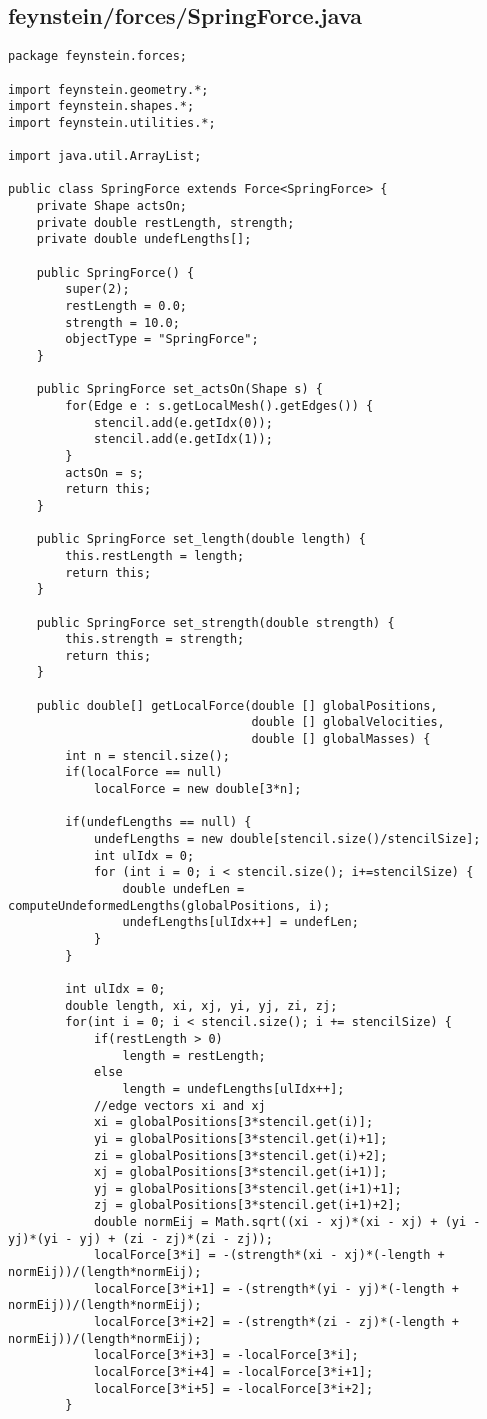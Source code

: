 \subsection*{feynstein/forces/SpringForce.java}
\begin{lstlisting}
package feynstein.forces;

import feynstein.geometry.*;
import feynstein.shapes.*;
import feynstein.utilities.*;

import java.util.ArrayList;

public class SpringForce extends Force<SpringForce> {
    private Shape actsOn;
    private double restLength, strength;
	private double undefLengths[];
	
    public SpringForce() {
		super(2);
		restLength = 0.0;
		strength = 10.0;
		objectType = "SpringForce";
    }

    public SpringForce set_actsOn(Shape s) {
		for(Edge e : s.getLocalMesh().getEdges()) {
			stencil.add(e.getIdx(0));
			stencil.add(e.getIdx(1));
		}
		actsOn = s;
		return this;
    }

    public SpringForce set_length(double length) {
		this.restLength = length;
		return this;
    }

    public SpringForce set_strength(double strength) {
		this.strength = strength;
		return this;
    }
	
	public double[] getLocalForce(double [] globalPositions,
								  double [] globalVelocities,
								  double [] globalMasses) {
		int n = stencil.size();
		if(localForce == null)
			localForce = new double[3*n];
		
		if(undefLengths == null) {
			undefLengths = new double[stencil.size()/stencilSize];
			int ulIdx = 0;
			for (int i = 0; i < stencil.size(); i+=stencilSize) {
				double undefLen = computeUndeformedLengths(globalPositions, i);
				undefLengths[ulIdx++] = undefLen;
			}
		}
		
		int ulIdx = 0;
		double length, xi, xj, yi, yj, zi, zj;
		for(int i = 0; i < stencil.size(); i += stencilSize) {
			if(restLength > 0)
				length = restLength;
			else 
				length = undefLengths[ulIdx++];
			//edge vectors xi and xj
			xi = globalPositions[3*stencil.get(i)];
			yi = globalPositions[3*stencil.get(i)+1];
			zi = globalPositions[3*stencil.get(i)+2];
			xj = globalPositions[3*stencil.get(i+1)];
			yj = globalPositions[3*stencil.get(i+1)+1];
			zj = globalPositions[3*stencil.get(i+1)+2];
			double normEij = Math.sqrt((xi - xj)*(xi - xj) + (yi - yj)*(yi - yj) + (zi - zj)*(zi - zj));
			localForce[3*i] = -(strength*(xi - xj)*(-length + normEij))/(length*normEij);
			localForce[3*i+1] = -(strength*(yi - yj)*(-length + normEij))/(length*normEij);
			localForce[3*i+2] = -(strength*(zi - zj)*(-length + normEij))/(length*normEij);
			localForce[3*i+3] = -localForce[3*i];
			localForce[3*i+4] = -localForce[3*i+1];
			localForce[3*i+5] = -localForce[3*i+2];
		}
		

\end{lstlisting}
